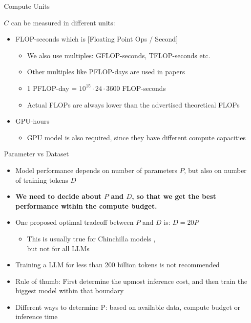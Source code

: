\begin{vbframe}{Compute Units}

\vfill

$C$  can be measured in different units:\newline

\begin{itemize}
     \item FLOP-seconds which is [Floating Point Ops / Second] 
 	\begin{itemize}
 	    \item We also use multiples: GFLOP-seconds, TFLOP-seconds etc.
 		\item Other multiples like PFLOP-days are used in papers
 		\item 1 PFLOP-day = $10^{15} \cdot 24 \cdot 3600$ FLOP-seconds
            \item Actual FLOPs are always lower than the advertised theoretical FLOPs
 	\end{itemize}
 	\item GPU-hours
 	\begin{itemize}
 	    \item GPU model is also required, since they have different compute capacities
 	\end{itemize}
 \end{itemize}

 \vfill

\end{vbframe}


\begin{vbframe}{Parameter vs Dataset}

\vfill

\begin{itemize}
    \item Model performance depends on number of parameters $P$, but also on number of training tokens $D$
	\item \textbf{We need to decide about $P$ and $D$, so that we get the best performance within the compute budget.}
	\item One proposed optimal tradeoff between $P$ and $D$ is: $D = 20 P$
	\begin{itemize}
	    \item This is usually true for Chinchilla models ,\\but not for all LLMs
	\end{itemize}
	\item Training a LLM for less than 200 billion tokens is not recommended
	\item Rule of thumb: First determine the upmost inference cost, and then train the biggest model within that boundary
    \item Different ways to determine P: based on available data, compute budget or inference time 
\end{itemize}

\vfill

\end{vbframe}

